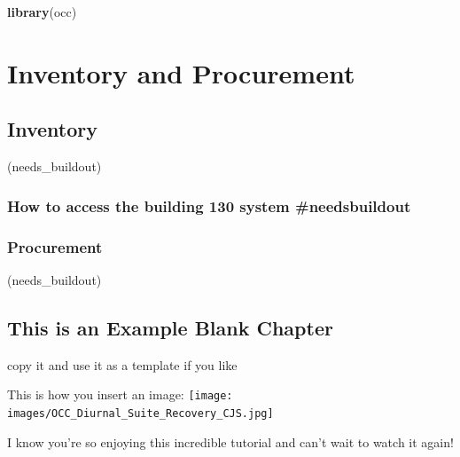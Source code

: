 \documentclass[]{book}
\newenvironment{Shaded}{\begin{snugshade}}{\end{snugshade}}
\newcommand{\KeywordTok}[1]{\textcolor[rgb]{0.13,0.29,0.53}{\textbf{#1}}}
\newcommand{\NormalTok}[1]{#1}
\begin{document}
\begin{Shaded}
\begin{Highlighting}[]
\KeywordTok{library}\NormalTok{(occ)}
\end{Highlighting}
\end{Shaded}

\hypertarget{part-inventory-and-procurement}{%
\part*{Inventory and Procurement}\label{part-inventory-and-procurement}}

\hypertarget{inventory}{%
\chapter{Inventory}\label{inventory}}

(needs\_buildout)

\hypertarget{how-to-access-the-building-130-system-needsbuildout}{%
\section{How to access the building 130 system \#needsbuildout}\label{how-to-access-the-building-130-system-needsbuildout}}

\hypertarget{procurement}{%
\section{Procurement}\label{procurement}}

(needs\_buildout)

\hypertarget{this-is-an-example-blank-chapter}{%
\chapter{This is an Example Blank Chapter}\label{this-is-an-example-blank-chapter}}

copy it and use it as a template if you like

This is how you insert an image:
\texttt{[image: images/OCC\_Diurnal\_Suite\_Recovery\_CJS.jpg]}

I know you're so enjoying this incredible tutorial and can't wait to watch it again!
\end{document}
